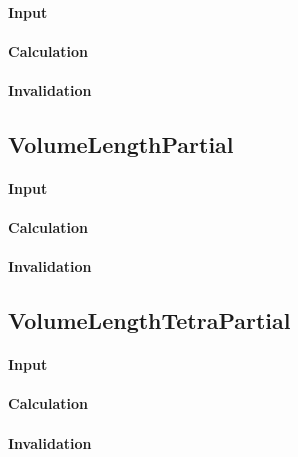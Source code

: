\paragraph{Input}

\paragraph{Calculation}

\paragraph{Invalidation}

\bigskip

\subsection{VolumeLengthPartial}

\paragraph{Input}

\paragraph{Calculation}

\paragraph{Invalidation}

\bigskip

\subsection{VolumeLengthTetraPartial}

\paragraph{Input}

\paragraph{Calculation}

\paragraph{Invalidation}

\bigskip

